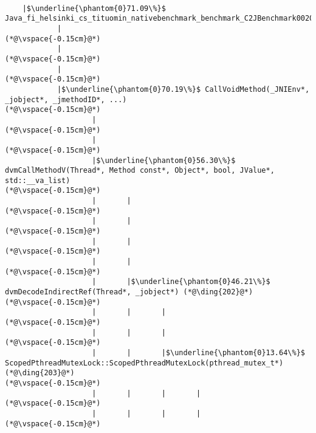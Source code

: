 \begin{lstlisting}[caption=Metodikutsu C$\to$Java 20 viiteparametrilla, label=profile:C2JBenchmark00206, numberbychapter=true, frame=lines, float, floatplacement=t]

    |$\underline{\phantom{0}71.09\%}$ Java_fi_helsinki_cs_tituomin_nativebenchmark_benchmark_C2JBenchmark00206_runInternal
            |
(*@\vspace{-0.15cm}@*)
            |
(*@\vspace{-0.15cm}@*)
            |
(*@\vspace{-0.15cm}@*)
            |$\underline{\phantom{0}70.19\%}$ CallVoidMethod(_JNIEnv*, _jobject*, _jmethodID*, ...)
(*@\vspace{-0.15cm}@*)
                    |
(*@\vspace{-0.15cm}@*)
                    |
(*@\vspace{-0.15cm}@*)
                    |$\underline{\phantom{0}56.30\%}$ dvmCallMethodV(Thread*, Method const*, Object*, bool, JValue*, std::__va_list)
(*@\vspace{-0.15cm}@*)
                    |       |
(*@\vspace{-0.15cm}@*)
                    |       |
(*@\vspace{-0.15cm}@*)
                    |       |
(*@\vspace{-0.15cm}@*)
                    |       |
(*@\vspace{-0.15cm}@*)
                    |       |$\underline{\phantom{0}46.21\%}$ dvmDecodeIndirectRef(Thread*, _jobject*) (*@\ding{202}@*)
(*@\vspace{-0.15cm}@*)
                    |       |       |
(*@\vspace{-0.15cm}@*)
                    |       |       |
(*@\vspace{-0.15cm}@*)
                    |       |       |$\underline{\phantom{0}13.64\%}$ ScopedPthreadMutexLock::ScopedPthreadMutexLock(pthread_mutex_t*) (*@\ding{203}@*)
(*@\vspace{-0.15cm}@*)
                    |       |       |       |
(*@\vspace{-0.15cm}@*)
                    |       |       |       |
(*@\vspace{-0.15cm}@*)

\end{lstlisting}
